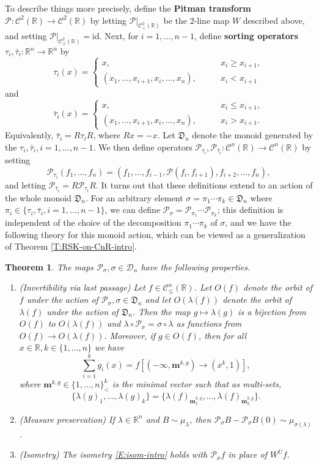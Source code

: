 \documentclass[11pt]{article}
\newcommand{\R}{\mathbb{R}}
\newcommand{\sig}{\sigma}
\newcommand{\la}{\lambda}
\newcommand{\cC}{\mathcal{C}}
\newcommand{\cD}{\mathcal{D}}
\newcommand{\cP}{\mathcal{P}}
\newcommand{\id}{\text{id}}
\newcommand{\bm}{\mathbf{m}}
\newtheorem{theorem}{Theorem}[section]
\theoremstyle{definition} %
\theoremstyle{remark} %
\begin{document}
To describe things more precisely, define the \textbf{Pitman transform} $\cP:\cC^2(\R) \to \cC^2(\R)$ by letting $\cP|_{\cC^2_<(\R)}$ be the $2$-line map $W$ described above, and setting $\cP|_{\cC^2_\ge(\R)} = \id$. Next, for $i = 1, \dots, n - 1$, define \textbf{sorting operators} $\tau_i, \bar \tau_i:\R^n \to \R^n$ by
$$
\tau_i(x) = \begin{cases}
x, \qquad &x_i \ge x_{i+1}, \\
(x_1, \dots, x_{i+1}, x_i, \dots, x_n), \qquad &x_i < x_{i+1}
\end{cases}
$$
and
$$
\bar \tau_i(x) = \begin{cases}
	x, \qquad &x_i \le x_{i+1}, \\
	(x_1, \dots, x_{i+1}, x_i, \dots, x_n), \qquad &x_i > x_{i+1}.
\end{cases}
$$
Equivalently, $\bar \tau_i = R \tau_i R$, where $R x = - x$. Let $\mathfrak D_n$ denote the monoid generated by the $\tau_i, \bar \tau_i, i = 1, \dots, n - 1$. We then define operators $\cP_{\tau_i}, \cP_{\bar \tau_i}:\cC^n(\R) \to \cC^n(\R)$ by setting 
$$
\cP_{\tau_i}(f_1, \dots, f_n) = (f_1, \dots, f_{i-1}, \cP(f_i, f_{i+1}), f_{i+2}, \dots, f_n),
$$
and letting $\cP_{\bar \tau_i} = R \cP_{\tau_i} R$. It turns out that these definitions extend to an action of the whole monoid $\mathfrak D_n$. For an arbitrary element $\sig = \pi_1 \cdots \pi_k \in \mathfrak D_n$ where $\pi_i \in \{\tau_i, \bar \tau_i, i = 1, \dots, n - 1\}$, we can define $\cP_\sig = \cP_{\pi_1} \cdots \cP_{\pi_k}$; this definition is independent of the choice of the decomposition $\pi_1 \cdots \pi_k$ of $\sig$, and we have the following theory for this monoid action, which can be viewed as a generalization of Theorem \ref{T:RSK-on-CnR-intro}.

\begin{theorem}
	\label{T:RSK-on-CnR-2-intro}
	The maps $\cP_\sig, \sig \in \cD_n$ have the following properties.
	\begin{enumerate}
		\item (Invertibility via last passage) Let $f \in \cC^n_\le(\R)$. Let $O(f)$ denote the orbit of $f$ under the action of $\cP_\sig, \sig \in \mathfrak D_n$ and let $O(\la(f))$ denote the orbit of $\la(f)$ under the action of $\mathfrak D_n$. Then the map $g \mapsto \la(g)$ is a bijection from $O(f)$ to $O(\la(f))$ and $\la \circ \cP_\sig = \sig \circ \la$ as functions from $O(f) \to O(\la(f))$. Moreover, if $g \in O(f)$, then for all $x \in \R, k \in \{1, \dots, n\}$ we have
		$$
		\sum_{i=1}^k g_i(x) = f[(-\infty, \bm^{k, g}) \to (x^k, 1)],
		$$
		where $\bm^{k, g} \in \{1, \dots, n\}^k_<$ is the minimal vector such that as multi-sets, 
		$$
		\{\la(g)_1, \dots, \la(g)_k\} = \{\la(f)_{\bm^{k, g}_1}, \dots, \la(f)_{\bm^{k, g}_k}\}.
		$$
		\item (Measure preservation) If $\la \in \R^n$ and $B \sim \mu_\la$, then $\cP_\sig B - \cP_\sig B(0) \sim \mu_{\sig(\la)}$.
		\item (Isometry) The isometry \eqref{E:isom-intro} holds with $\cP_\sig f$ in place of $W^U f$.
	\end{enumerate}
\end{theorem}
\end{document}
